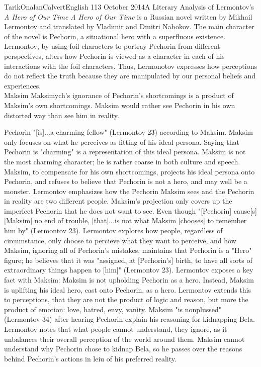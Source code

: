 \documentclass[12pt]{article}
\begin{document}
    \begin{mla}{Tarik}{Onalan}{Calvert}{English 1}{13 October 2014}{A Literary Analysis of Lermontov's \textit{A Hero of Our Time}}
        \textit{A Hero of Our Time} is a Russian novel written by Mikhail Lermontov
        and translated by Vladimir and Dmitri Nabokov. The main character of the
        novel is Pechorin, a situational hero with a superfluous existence. Lermontov,
        by using foil characters to portray Pechorin from different perspectives,
        alters how Pechorin is viewed as a character in each of his interactions
        with the foil characters. Thus, Lermonotov expresses how perceptions do not
        reflect the truth because they are manipulated by our personal beliefs and
        experiences.\\

        Maksim Maksimych's ignorance of Pechorin's shortcomings is a product of Maksim's
        own shortcomings. Maksim would rather see Pechorin in his own distorted way
        than see him in reality.

        Pechorin "[is]...a charming fellow" (Lermontov 23) according to Maksim.
        Maksim only focuses on what he perceives as fitting of his ideal persona.
        Saying that Pechorin is "charming" is a representation of this ideal
        persona. Maksim is not the most charming character; he is rather coarse in
        both culture and speech. Maksim, to compensate for his own shortcomings,
        projects his ideal persona onto Pechorin, and refuses to believe that Pechorin
        is not a hero, and may well be a monster. Lermontov emphasizes how the Pechorin
        Maksim sees and the Pechorin in reality are two different people. Maksim's projection
        only covers up the imperfect Pechorin that he does not want to see. Even
        though "[Pechorin] cause[s] [Maksim] no end of trouble, [that]...is not what
        Maksim [chooses] to remember him by" (Lermontov 23). Lermontov explores how
        people, regardless of circumstance, only choose to percieve what they want to
        perceive, and how Maksim, ignoring all of Pechorin's mistakes, maintains that
        Pechorin is a "Hero" figure; he believes that it was "assigned, at [Pechorin's]
        birth, to have all sorts of extraordinary things happen to [him]" (Lermontov 23).
        Lermontov exposes a key fact with Maksim: Maksim is not upholding Pechorin as a
        hero. Instead, Maksim is uplifting his ideal hero, cast onto Pechorin, as a hero.
        Lermontov extends this to perceptions, that they are not the product of logic
        and reason, but more the product of emotion: love, hatred, envy, vanity. Maksim
        "is nonplussed" (Lermontov 34) after hearing Pechorin explain his reasoning for
        kidnapping Bela. Lermontov notes that what people cannot understand, they ignore,
        as it unbalances their overall perception of the world around them. Maksim
        cannot understand why Pechorin chose to kidnap Bela, so he passes over the
        reasons behind Pechorin's actions in leiu of his preferred reality.\\


\end{mla}
\end{document}
